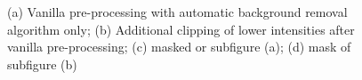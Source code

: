 \begin{figure}
\begin{subfigure}[b]{0.22\textwidth}
		\caption{}
		\label{subfig:clipping-mask}
	\end{subfigure}
	   \caption{(a) Vanilla pre-processing with automatic background removal algorithm only; (b) Additional clipping of lower intensities after vanilla pre-processing; (c) masked or subfigure (a); (d) mask of subfigure (b)}
	   \label{fig:pre-processing-golgi}
\end{figure}
